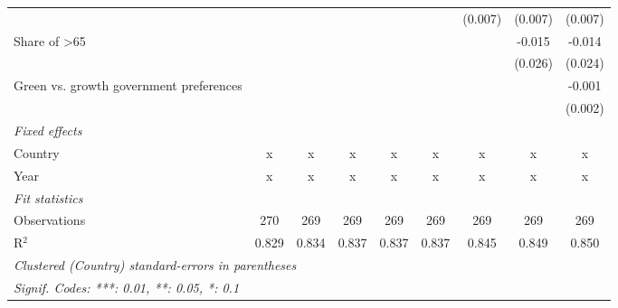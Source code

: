 \begin{table}[htbp]
\begin{tabular}{lcccccccc}
                                                &         &         &         &         &         & (0.007) & (0.007) & (0.007)\\   
      Share of >65                              &         &         &         &         &         &         & -0.015  & -0.014\\   
                                                &         &         &         &         &         &         & (0.026) & (0.024)\\   
      Green vs. growth government preferences   &         &         &         &         &         &         &         & -0.001\\   
                                                &         &         &         &         &         &         &         & (0.002)\\   
      \emph{Fixed effects}\\
      Country                                   & x       & x       & x       & x       & x       & x       & x       & x\\  
      Year                                      & x       & x       & x       & x       & x       & x       & x       & x\\  
      \midrule \emph{Fit statistics}\\
      Observations                              & 270     & 269     & 269     & 269     & 269     & 269     & 269     & 269\\  
      R$^2$                                     & 0.829   & 0.834   & 0.837   & 0.837   & 0.837   & 0.845   & 0.849   & 0.850\\  
      \midrule
      \multicolumn{9}{l}{\emph{Clustered (Country) standard-errors in parentheses}}\\
      \multicolumn{9}{l}{\emph{Signif. Codes: ***: 0.01, **: 0.05, *: 0.1}}\\
   \end{tabular}
\end{table}


